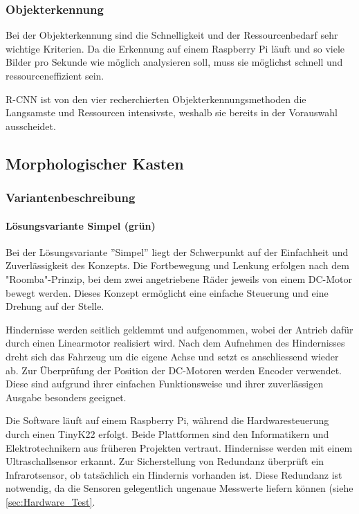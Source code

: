 \documentclass[../main.tex]{subfiles}
\begin{document}
\subsubsection{Objekterkennung}

Bei der Objekterkennung sind die Schnelligkeit und der Ressourcenbedarf sehr wichtige Kriterien.
Da die Erkennung auf einem Raspberry Pi läuft und so viele Bilder pro Sekunde wie möglich analysieren soll, muss sie möglichst schnell und ressourceneffizient sein. 

R-CNN ist von den vier recherchierten Objekterkennungsmethoden die Langsamste und Ressourcen intensivste, weshalb sie bereits in der Vorauswahl ausscheidet.

\newpage
\subsection{Morphologischer Kasten}



    \subsubsection{Variantenbeschreibung}
    \paragraph{Lösungsvariante Simpel (grün)} 
    \label{a3:loesungsvariante_Simpel}
    Bei der Lösungsvariante ''Simpel'' liegt der Schwerpunkt auf der Einfachheit und Zuverlässigkeit des Konzepts. Die Fortbewegung und Lenkung erfolgen nach dem "Roomba"-Prinzip, bei dem zwei angetriebene Räder jeweils von einem DC-Motor bewegt werden. Dieses Konzept ermöglicht eine einfache Steuerung und eine Drehung auf der Stelle.

    Hindernisse werden seitlich geklemmt und aufgenommen, wobei der Antrieb dafür durch einen Linearmotor realisiert wird. Nach dem Aufnehmen des Hindernisses dreht sich das Fahrzeug um die eigene Achse und setzt es anschliessend wieder ab. Zur Überprüfung der Position der DC-Motoren werden Encoder verwendet. Diese sind aufgrund ihrer einfachen Funktionsweise und ihrer zuverlässigen Ausgabe besonders geeignet.

    Die Software läuft auf einem Raspberry Pi, während die Hardwaresteuerung durch einen TinyK22 erfolgt. Beide Plattformen sind den Informatikern und Elektrotechnikern aus früheren Projekten vertraut. Hindernisse werden mit einem Ultraschallsensor erkannt. Zur Sicherstellung von Redundanz überprüft ein Infrarotsensor, ob tatsächlich ein Hindernis vorhanden ist. Diese Redundanz ist notwendig, da die Sensoren gelegentlich ungenaue Messwerte liefern können (siehe \ref{sec:Hardware_Test}. 
\end{document}
